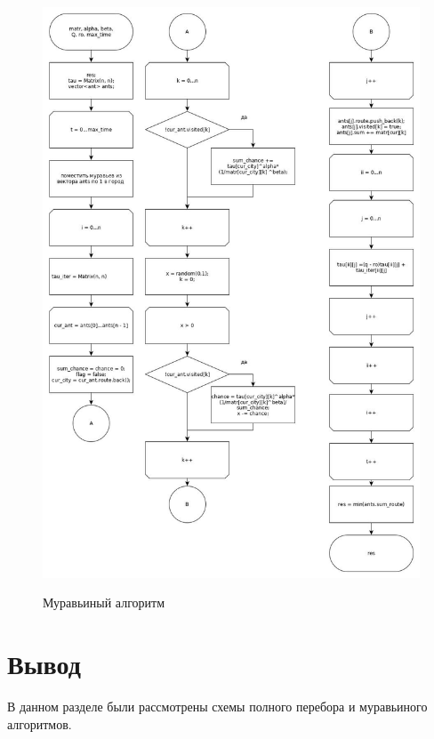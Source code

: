 \documentclass[a4paper,12pt]{report}
\begin{document}
		
		\begin{figure}[h!]
			\begin{center}
				{\includegraphics[scale = 0.5]{ant.jpg}}%
				\caption{Муравьиный алгоритм}
				\label{ris:muravei}
			\end{center}
		\end{figure}
	
	\section{Вывод}

			В данном разделе были рассмотрены схемы полного перебора и муравьиного алгоритмов.

    \newpage
\end{document}
